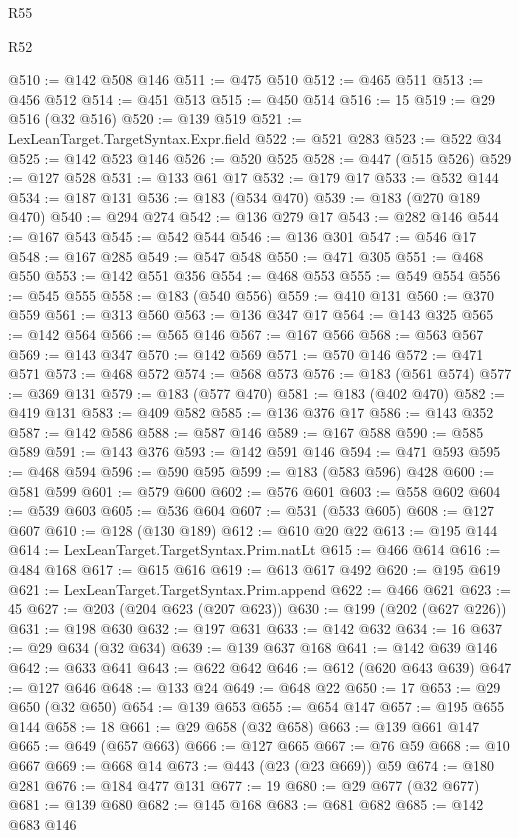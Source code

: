 \begin{lexlean}{R55}
\begin{lexlean}{R52}
\begin{coremodule}
{{{{{{{{{{{{{{{{{{{{{{{{{{{{{{{{{{{{{{{{{{{{{{{{{{{{{{{{{{{{{{{{{{{{{{{{{{{{{{{{{{{{{{{{{{{{{{{{{{{{{{{{{{{{{{{{{{{{{{{{{{{{{{{{{{{{{{{{{{{{{{{{{{{{{{{{{{{{{{{{{{{{{{{{{{{{{{{{{{{{{{{{{{{{{{{{{{{{{{@510 := @142 @508 @146
@511 := @475 @510
@512 := @465 @511
@513 := @456 @512
@514 := @451 @513
@515 := @450 @514
@516 := 15
@519 := @29 @516 (@32 @516)
@520 := @139 @519
@521 := LexLeanTarget.TargetSyntax.Expr.field
@522 := @521 @283
@523 := @522 @34
@525 := @142 @523 @146
@526 := @520 @525
@528 := @447 (@515 @526)
@529 := @127 @528
@531 := @133 @61 @17
@532 := @179 @17
@533 := @532 @144
@534 := @187 @131
@536 := @183 (@534 @470)
@539 := @183 (@270 @189 @470)
@540 := @294 @274
@542 := @136 @279 @17
@543 := @282 @146
@544 := @167 @543
@545 := @542 @544
@546 := @136 @301
@547 := @546 @17
@548 := @167 @285
@549 := @547 @548
@550 := @471 @305
@551 := @468 @550
@553 := @142 @551 @356
@554 := @468 @553
@555 := @549 @554
@556 := @545 @555
@558 := @183 (@540 @556)
@559 := @410 @131
@560 := @370 @559
@561 := @313 @560
@563 := @136 @347 @17
@564 := @143 @325
@565 := @142 @564
@566 := @565 @146
@567 := @167 @566
@568 := @563 @567
@569 := @143 @347
@570 := @142 @569
@571 := @570 @146
@572 := @471 @571
@573 := @468 @572
@574 := @568 @573
@576 := @183 (@561 @574)
@577 := @369 @131
@579 := @183 (@577 @470)
@581 := @183 (@402 @470)
@582 := @419 @131
@583 := @409 @582
@585 := @136 @376 @17
@586 := @143 @352
@587 := @142 @586
@588 := @587 @146
@589 := @167 @588
@590 := @585 @589
@591 := @143 @376
@593 := @142 @591 @146
@594 := @471 @593
@595 := @468 @594
@596 := @590 @595
@599 := @183 (@583 @596) @428
@600 := @581 @599
@601 := @579 @600
@602 := @576 @601
@603 := @558 @602
@604 := @539 @603
@605 := @536 @604
@607 := @531 (@533 @605)
@608 := @127 @607
@610 := @128 (@130 @189)
@612 := @610 @20 @22
@613 := @195 @144
@614 := LexLeanTarget.TargetSyntax.Prim.natLt
@615 := @466 @614
@616 := @484 @168
@617 := @615 @616
@619 := @613 @617 @492
@620 := @195 @619
@621 := LexLeanTarget.TargetSyntax.Prim.append
@622 := @466 @621
@623 := 45
@627 := @203 (@204 @623 (@207 @623))
@630 := @199 (@202 (@627 @226))
@631 := @198 @630
@632 := @197 @631
@633 := @142 @632
@634 := 16
@637 := @29 @634 (@32 @634)
@639 := @139 @637 @168
@641 := @142 @639 @146
@642 := @633 @641
@643 := @622 @642
@646 := @612 (@620 @643 @639)
@647 := @127 @646
@648 := @133 @24
@649 := @648 @22
@650 := 17
@653 := @29 @650 (@32 @650)
@654 := @139 @653
@655 := @654 @147
@657 := @195 @655 @144
@658 := 18
@661 := @29 @658 (@32 @658)
@663 := @139 @661 @147
@665 := @649 (@657 @663)
@666 := @127 @665
@667 := @76 @59
@668 := @10 @667
@669 := @668 @14
@673 := @443 (@23 (@23 @669)) @59
@674 := @180 @281
@676 := @184 @477 @131
@677 := 19
@680 := @29 @677 (@32 @677)
@681 := @139 @680
@682 := @145 @168
@683 := @681 @682
@685 := @142 @683 @146
}}}}}}}}}}}}}}}}}}}}}}}}}}}}}}}}}}}}}}}}}}}}}}}}}}}}}}}}}}}}}}}}}}}}}}}}}}}}}}}}}}}}}}}}}}}}}}}}}}}}}}}}}}}}}}}}}}}}}}}}}}}}}}}}}}}}}}}}}}}}}}}}}}}}}}}}}}}}}}}}}}}}}}}}}}}}}}}}}}}}}}}}}}}}}}}}}}}}}}
\end{coremodule}
\end{lexlean}
\end{lexlean}

